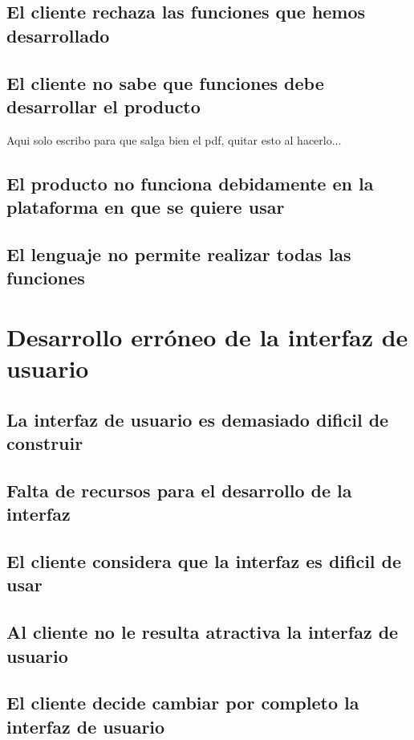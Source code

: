 \documentclass[spanish,a4paper,12pt]{report}	%
\begin{document}
	\subsection{El cliente rechaza las funciones que hemos desarrollado}

	\subsection{El cliente no sabe que funciones debe desarrollar el producto}
	Aqui solo escribo para que salga bien el pdf, quitar esto al hacerlo...
	\subsection{El producto no funciona debidamente en la plataforma en que se quiere usar}

	\subsection{El lenguaje no permite realizar todas las funciones}


\section{Desarrollo erróneo de la interfaz de usuario}

	\subsection{La interfaz de usuario es demasiado dificil de construir}

	\subsection{Falta de recursos para el desarrollo de la interfaz}

	\subsection{El cliente considera que la interfaz es dificil de usar}

	\subsection{Al cliente no le resulta atractiva la interfaz de usuario}

	\subsection{El cliente decide cambiar por completo la interfaz de usuario}
\end{document}
